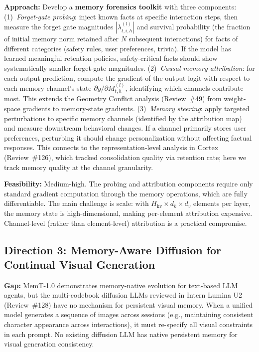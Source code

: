 \documentclass[11pt,a4paper]{article}
\begin{document}
\textbf{Approach:} Develop a \textbf{memory forensics toolkit} with three components: (1)~\emph{Forget-gate probing}: inject known facts at specific interaction steps, then measure the forget gate magnitudes $|\lambda^{(l)}_{t,i,h}|$ and survival probability (the fraction of initial memory norm retained after $N$ subsequent interactions) for facts of different categories (safety rules, user preferences, trivia). If the model has learned meaningful retention policies, safety-critical facts should show systematically smaller forget-gate magnitudes. (2)~\emph{Causal memory attribution}: for each output prediction, compute the gradient of the output logit with respect to each memory channel's state $\partial y / \partial M^{(l)}_{t,h}$, identifying which channels contribute most. This extends the Geometry Conflict analysis (Review~\#49) from weight-space gradients to memory-state gradients. (3)~\emph{Memory steering}: apply targeted perturbations to specific memory channels (identified by the attribution map) and measure downstream behavioral changes. If a channel primarily stores user preferences, perturbing it should change personalization without affecting factual responses. This connects to the representation-level analysis in Cortex (Review~\#126), which tracked consolidation quality via retention rate; here we track memory quality at the channel granularity.

\textbf{Feasibility:} Medium-high. The probing and attribution components require only standard gradient computation through the memory operations, which are fully differentiable. The main challenge is scale: with $H_{\text{kv}} \times d_k \times d_v$ elements per layer, the memory state is high-dimensional, making per-element attribution expensive. Channel-level (rather than element-level) attribution is a practical compromise.

\subsection{Direction 3: Memory-Aware Diffusion for Continual Visual Generation}
\textbf{Gap:} MemT-1.0 demonstrates memory-native evolution for text-based LLM agents, but the multi-codebook diffusion LLMs reviewed in Intern Lumina U2 (Review~\#128) have no mechanism for persistent visual memory. When a unified model generates a sequence of images across sessions (e.g., maintaining consistent character appearance across interactions), it must re-specify all visual constraints in each prompt. No existing diffusion LLM has native persistent memory for visual generation consistency.
\end{document}
